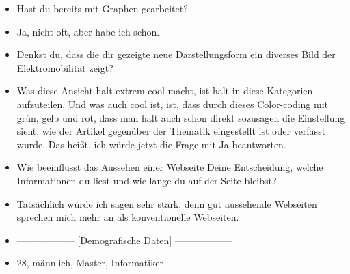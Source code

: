 {\begin{itemize}[]
        Aber ansonsten finde ich das ziemlich cool, dass man halt über diese Graphen recht schnell zu irgendwelchen Artikeln kommt.
        Ja, und wenn die Knoten, die noch keine Betitelung hatten, wenn die sozusagen auch noch eine Betitelung bekommen würden, dann wäre die Navigation durch diesen ganzen Graphen noch intuitiver und einfacher.
        \item {} Hast du bereits mit Graphen gearbeitet?
        \item {} Ja, nicht oft, aber habe ich schon.
        \item {} Denkst du, dass die dir gezeigte neue Darstellungsform ein diverses Bild der Elektromobilität zeigt?
        \item {} Was diese Ansicht halt extrem cool macht, ist halt in diese Kategorien aufzuteilen.
        Und was auch cool ist, ist, dass durch dieses Color-coding mit grün, gelb und rot, dass man halt auch schon direkt sozusagen die Einstellung sieht, wie der Artikel gegenüber der Thematik eingestellt ist oder verfasst wurde. 
        Das heißt, ich würde jetzt die Frage mit Ja beantworten.
        \item {} Wie beeinflusst das Aussehen einer Webseite Deine Entscheidung, welche Informationen du liest und wie lange du auf der Seite bleibst?
        \item {} Tatsächlich würde ich sagen sehr stark, denn gut aussehende Webseiten sprechen mich mehr an als konventionelle Webseiten.
        \item {------------------} [Demografische Daten] {------------------}
        \item {} 28, männlich, Master, Informatiker
    \end{itemize}}
\nolinenumbers

